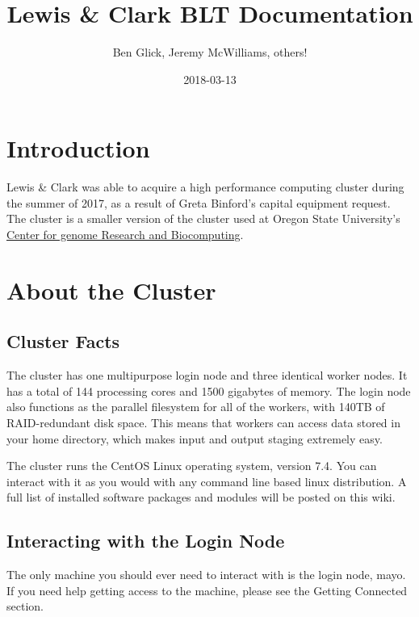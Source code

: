 \documentclass[]{book}
\title{Lewis \& Clark BLT Documentation}
\author{Ben Glick, Jeremy McWilliams, others!}
\date{2018-03-13}
\theoremstyle{definition}
\theoremstyle{definition}
\theoremstyle{definition}
\theoremstyle{remark}
\begin{document}
\maketitle

{
\setcounter{tocdepth}{1}
\tableofcontents
}
\chapter*{Introduction}\label{introduction}

Lewis \& Clark was able to acquire a high performance computing cluster
during the summer of 2017, as a result of Greta Binford's capital
equipment request. The cluster is a smaller version of the cluster used
at Oregon State University's \href{http://cgrb.oregonstate.edu/}{Center
for genome Research and Biocomputing}.

\chapter{About the Cluster}\label{about-the-cluster}

\section{Cluster Facts}\label{cluster-facts}

The cluster has one multipurpose login node and three identical worker
nodes. It has a total of 144 processing cores and 1500 gigabytes of
memory. The login node also functions as the parallel filesystem for all
of the workers, with 140TB of RAID-redundant disk space. This means that
workers can access data stored in your home directory, which makes input
and output staging extremely easy.

The cluster runs the CentOS Linux operating system, version 7.4. You can
interact with it as you would with any command line based linux
distribution. A full list of installed software packages and modules
will be posted on this wiki.

\section{Interacting with the Login
Node}\label{interacting-with-the-login-node}

The only machine you should ever need to interact with is the login
node, mayo. If you need help getting access to the machine, please see
the Getting Connected section.
\end{document}
